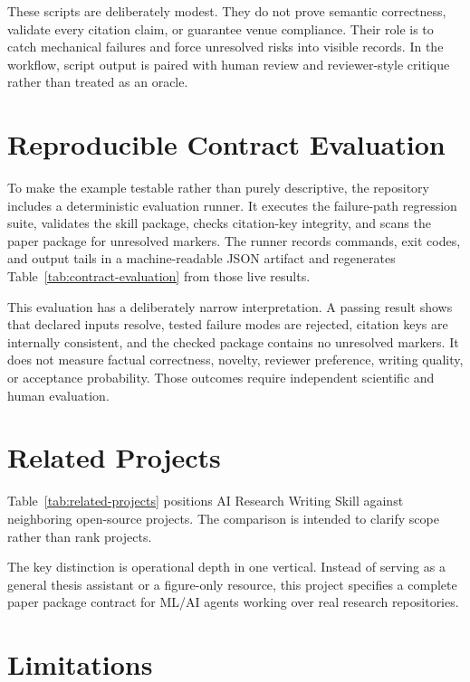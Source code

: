 \documentclass{article}
\begin{document}
These scripts are deliberately modest. They do not prove semantic correctness, validate every citation claim, or guarantee venue compliance. Their role is to catch mechanical failures and force unresolved risks into visible records. In the workflow, script output is paired with human review and reviewer-style critique rather than treated as an oracle.

\section{Reproducible Contract Evaluation}

To make the example testable rather than purely descriptive, the repository includes a deterministic evaluation runner. It executes the failure-path regression suite, validates the skill package, checks citation-key integrity, and scans the paper package for unresolved markers. The runner records commands, exit codes, and output tails in a machine-readable JSON artifact and regenerates Table~\ref{tab:contract-evaluation} from those live results.



This evaluation has a deliberately narrow interpretation. A passing result shows that declared inputs resolve, tested failure modes are rejected, citation keys are internally consistent, and the checked package contains no unresolved markers. It does not measure factual correctness, novelty, reviewer preference, writing quality, or acceptance probability. Those outcomes require independent scientific and human evaluation.

\section{Related Projects}

Table~\ref{tab:related-projects} positions AI Research Writing Skill against neighboring open-source projects. The comparison is intended to clarify scope rather than rank projects.



The key distinction is operational depth in one vertical. Instead of serving as a general thesis assistant or a figure-only resource, this project specifies a complete paper package contract for ML/AI agents working over real research repositories.

\section{Limitations}
\end{document}

